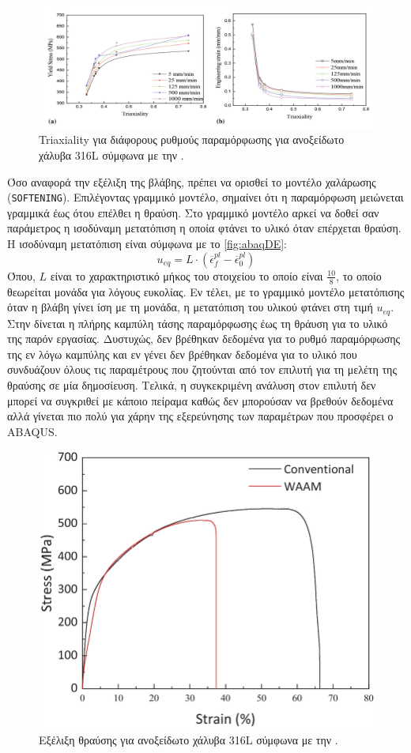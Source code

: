 \documentclass{article}
\begin{document}
\begin{figure}[H]
    \centering
    \includegraphics[width=0.9\linewidth]{media/triaxiCurve.png}
    \caption{Triaxiality για διάφορους ρυθμούς παραμόρφωσης για ανοξείδωτο χάλυβα 316L σύμφωνα με την \cite{triaxiality}.}
    \label{fig:triaxial}
\end{figure}


Όσο αναφορά την εξέλιξη της βλάβης, πρέπει να ορισθεί το μοντέλο χαλάρωσης (\texttt{SOFTENING}). Επιλέγοντας γραμμικό μοντέλο, σημαίνει ότι η παραμόρφωση μειώνεται γραμμικά έως ότου επέλθει η θραύση. Στο γραμμικό μοντέλο αρκεί να δοθεί σαν παράμετρος η ισοδύναμη μετατόπιση η οποία φτάνει το υλικό όταν επέρχεται θραύση. Η ισοδύναμη μετατόπιση είναι σύμφωνα με το \ref{fig:abaqDE}:
\begin{equation}
    u_{eq} = L\cdot (\overline{\epsilon}^{pl}_f - \overline{\epsilon}^{pl}_0)
\end{equation}
Όπου, $L$ είναι το χαρακτηριστικό μήκος του στοιχείου το οποίο είναι $\frac{10}{8}$, το οποίο θεωρείται μονάδα για λόγους ευκολίας. Εν τέλει, με το γραμμικό μοντέλο μετατόπισης όταν η βλάβη γίνει ίση με τη μονάδα, η μετατόπιση του υλικού φτάνει στη τιμή $u_{eq}$. Στην \cite{fracture} δίνεται η πλήρης καμπύλη τάσης παραμόρφωσης έως τη θράυση για το υλικό της παρόν εργασίας. Δυστυχώς, δεν βρέθηκαν δεδομένα για το ρυθμό παραμόρφωσης της εν λόγω καμπύλης και εν γένει δεν βρέθηκαν δεδομένα για το υλικό που συνδυάζουν όλους τις παραμέτρους που ζητούνται από τον επιλυτή για τη μελέτη της θραύσης σε μία δημοσίευση. Τελικά, η συγκεκριμένη ανάλυση στον επιλυτή δεν μπορεί να συγκριθεί με κάποιο πείραμα καθώς δεν μπορούσαν να βρεθούν δεδομένα αλλά γίνεται πιο πολύ για χάρην της εξερεύνησης των παραμέτρων που προσφέρει ο ABAQUS.
\begin{figure}[H]
    \centering
    \includegraphics[width=0.6\linewidth]{media/fractureCurve.png}
    \caption{Εξέλιξη θραύσης για ανοξείδωτο χάλυβα 316L σύμφωνα με την \cite{fracture}.}
    \label{fig:fra}
\end{figure}
\end{document}

